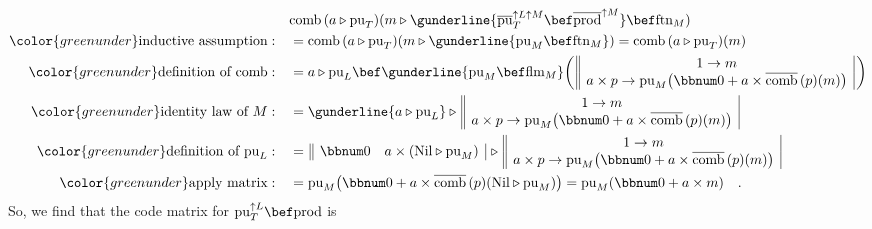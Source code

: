 \begin{align*}
 & \text{comb}\,(a\triangleright\text{pu}_{T})(m\triangleright\gunderline{\overline{\text{pu}}_{T}^{\uparrow L\uparrow M}\bef\overline{\text{prod}}^{\uparrow M}}\bef\text{ftn}_{M})\\
{\color{greenunder}\text{inductive assumption}:}\quad & =\text{comb}\,(a\triangleright\text{pu}_{T})(m\triangleright\gunderline{\text{pu}_{M}\bef\text{ftn}_{M}})=\text{comb}\,(a\triangleright\text{pu}_{T})(m)\\
{\color{greenunder}\text{definition of }\text{comb}:}\quad & =a\triangleright\text{pu}_{L}\bef\gunderline{\text{pu}_{M}\bef\text{flm}_{M}}\bigg(\,\begin{array}{||c|}
1\rightarrow m\\
a\times p\rightarrow\text{pu}_{M}\big(\bbnum 0+a\times\overline{\text{comb}}\,(p)(m)\big)
\end{array}\,\bigg)\\
{\color{greenunder}\text{identity law of }M:}\quad & =\gunderline{a\triangleright\text{pu}_{L}}\triangleright\,\begin{array}{||c|}
1\rightarrow m\\
a\times p\rightarrow\text{pu}_{M}\big(\bbnum 0+a\times\overline{\text{comb}}\,(p)(m)\big)
\end{array}\\
{\color{greenunder}\text{definition of }\text{pu}_{L}:}\quad & =\,\begin{array}{||cc|}
\bbnum 0 & a\times(\text{Nil}\triangleright\text{pu}_{M})\end{array}\,\triangleright\,\begin{array}{||c|}
1\rightarrow m\\
a\times p\rightarrow\text{pu}_{M}\big(\bbnum 0+a\times\overline{\text{comb}}\,(p)(m)\big)
\end{array}\\
{\color{greenunder}\text{apply matrix}:}\quad & =\text{pu}_{M}\big(\bbnum 0+a\times\overline{\text{comb}}\,(p)(\text{Nil}\triangleright\text{pu}_{M})\big)=\text{pu}_{M}(\bbnum 0+a\times m)\quad.
\end{align*}
So, we find that the code matrix for $\text{pu}_{T}^{\uparrow L}\bef\text{prod}$
is

